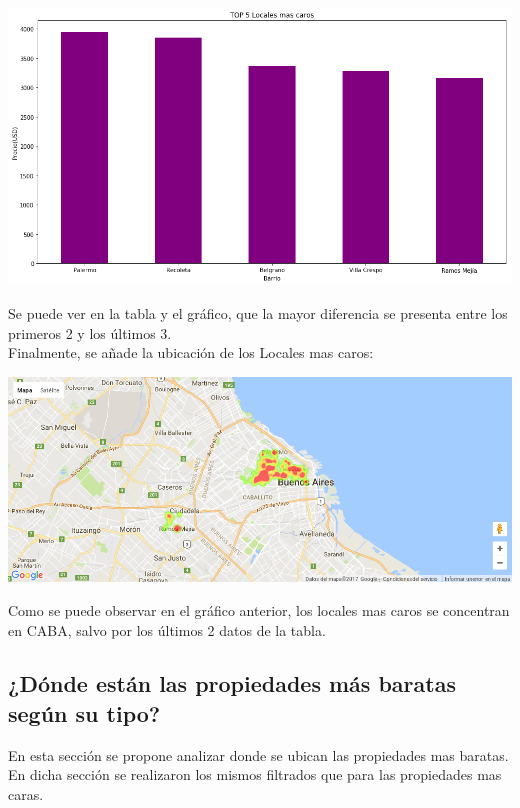 \documentclass[a4paper, 10pt]{article}
\begin{document}
				\begin{center}
   		    				\includegraphics[width=\textwidth]{images/topLc}
				\end{center}

				Se puede ver en la tabla y el gráfico, que la mayor diferencia se presenta entre los primeros 2 y los últimos 3.\\
				Finalmente, se añade la ubicación de los Locales mas caros:

				\begin{center}
   		    				\includegraphics[width=\textwidth]{images/ubicLc}
				\end{center}

				Como se puede observar en el gráfico anterior, los locales mas caros se concentran en CABA, salvo por los últimos 2 datos de la tabla.


			\subsection{¿Dónde están las propiedades más baratas según su tipo?}
				En esta sección se propone analizar donde se ubican las propiedades mas baratas. \\
				En dicha sección se realizaron los mismos filtrados que para las propiedades mas caras.
\end{document}
